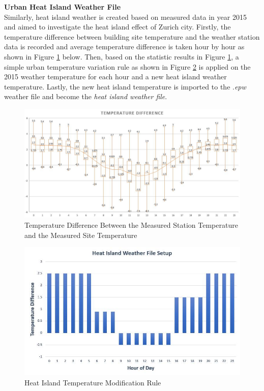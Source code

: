 \documentclass[a4paper, oneside]{discothesis}
\begin{document}
			\textbf{Urban Heat Island Weather File}\\
				Similarly, heat island weather is created based on measured data in year 2015 and aimed to investigate the heat island effect of Zurich city. Firstly, the temperature difference between building site temperature and the weather station data is recorded and average temperature difference is taken hour by hour as shown in Figure \ref{fig:HeatIslandConst} below. Then, based on the statistic results in Figure \ref{fig:HeatIslandConst}, a simple urban temperature variation rule as shown in Figure \ref{fig:HeatIslandRule} is applied on the 2015 weather temperature for each hour and a new heat island weather temperature. Lastly, the new heat island temperature is imported to the .\textit{epw} weather file and become the \textit{heat island weather file}.


				\begin{figure}[H]
				\centering
				\includegraphics[scale=0.55]{HeatIsland_Construction.jpg}
				\caption{Temperature Difference Between the Measured Station Temperature and the Measured Site Temperature }
				\label{fig:HeatIslandConst}
				\end{figure}
				
				\begin{figure}[H]
				\centering
				\includegraphics[scale=0.75]{HeatIslandConstruction.jpg}
				\caption{Heat Island Temperature Modification Rule}
				\label{fig:HeatIslandRule}
				\end{figure}
				
\end{document}
